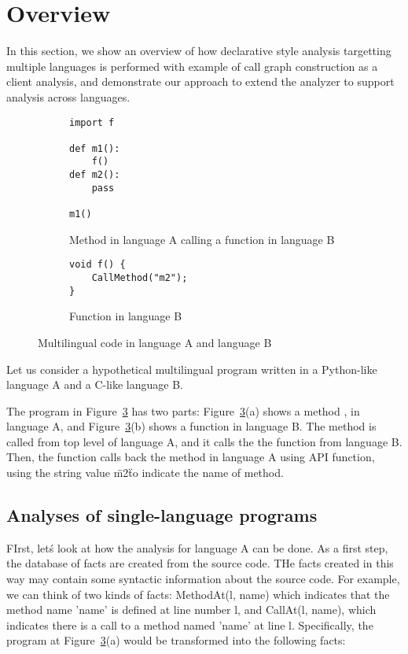\section{Overview}
In this section, we show an overview of how declarative style analysis
targetting multiple languages is performed with example of call graph
construction as a client analysis,
and demonstrate our approach to extend the analyzer to support analysis
across languages.

\begin{figure}[t]
  \centering
  \vspace{2mm}
  \begin{subfigure}[t]{0.5\textwidth}
    \begin{lstlisting}[style=java,xleftmargin=2.5em]
import f

def m1():
    f()
def m2():
    pass

m1()
    \end{lstlisting}
    \vspace*{-.5em}
    \caption{Method in language A calling a function in language B}
    \label{fig:exam:langA}
  \end{subfigure}
  \begin{subfigure}[t]{0.5\textwidth}
    \begin{lstlisting}[style=cpp,firstnumber=5,xleftmargin=2.5em]
void f() {
    CallMethod("m2");
}
    \end{lstlisting}
    \vspace*{-.5em}
    \caption{Function in language B}
    \label{fig:exam:langB}
  \end{subfigure}
  \vspace*{-.5em}
  \caption{Multilingual code in language A and language B}
  \label{fig:exam}
\end{figure}

Let us consider a hypothetical multilingual program written in a Python-like language A
and a C-like language B.

The program in Figure~\ref{fig:exam} has two parts: Figure~\ref{fig:exam}(a)
shows a method ,  in language A, and
Figure~\ref{fig:exam}(b) shows a function  in language B.  The method
 is called from top level of language A, and it calls the the function 
from language B.  Then, the function  calls back the method  in language A
using API function, using the string value \"m2\" to indicate the name of method.

\subsection{Analyses of single-language programs}
FIrst, let\'s look at how the analysis for language A can be done.
As a first step, the database of facts are created from the source code. THe
facts created in this way may contain some syntactic information about the
source code. For example, we can think of two kinds of facts: MethodAt(l, name) which
indicates that the method name 'name' is defined at line number l,
and CallAt(l, name), which indicates there is a call to a method named 'name' at line l.
Specifically, the program at Figure~\ref{fig:exam}(a) would be transformed into
the following facts:

